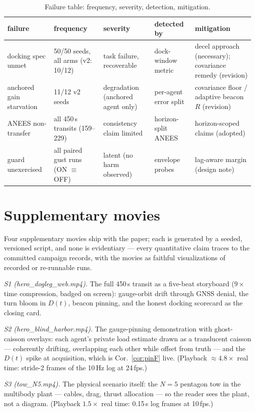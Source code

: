 \documentclass[letterpaper, 10pt, journal]{IEEEtran}
\begin{document}
\begin{table}[t]
\centering
\caption{Failure table: frequency, severity, detection, mitigation.}
\label{tab:failure}
\begin{tabular}{p{1.7cm}p{1.15cm}p{1.05cm}p{1.35cm}p{1.55cm}}
\toprule
failure & frequency & severity & detected by & mitigation \\
\midrule
docking spec unmet & 50/50 seeds, all arms (v2: 10/12) & task failure,
recoverable & dock-window metric & decel approach (necessary); covariance
remedy (revision) \\
anchored gain starvation & 11/12 v2 seeds & degradation (anchored agent
only) & per-agent error split & covariance floor / adaptive beacon $R$
(revision) \\
ANEES non-transfer & all 450\,s transits (159--229) & consistency claim
limited & horizon-split ANEES & horizon-scoped claims (adopted) \\
guard unexercised & all paired gust runs (ON $\equiv$ OFF) & latent (no
harm observed) & envelope probes & lag-aware margin (design note) \\
\bottomrule
\end{tabular}
\end{table}

\section{Supplementary movies}
Four supplementary movies ship with the paper; each is generated by a seeded,
versioned script, and none is evidentiary --- every quantitative claim traces
to the committed campaign records, with the movies as faithful visualizations
of recorded or re-runnable runs.

\emph{S1 (hero\_dogleg\_web.mp4).} The full 450\,s transit as a five-beat
storyboard ($9\times$ time compression, badged on screen): gauge-orbit drift
through GNSS denial, the turn bloom in $D(t)$, beacon pinning, and the honest
docking scorecard as the closing card.

\emph{S2 (hero\_blind\_harbor.mp4).} The gauge-pinning demonstration with
ghost-caisson overlays: each agent's private load estimate drawn as a
translucent caisson --- coherently drifting, overlapping each other while
offset from truth --- and the $D(t)$ spike at acquisition, which is
Cor.~\ref{cor:pinF} live. (Playback $\approx 4.8\times$ real time: stride-2 frames of
the 10\,Hz log at 24\,fps.)

\emph{S3 (tow\_N5.mp4).} The physical scenario itself: the $N{=}5$ pentagon
tow in the multibody plant --- cables, drag, thrust allocation --- so the
reader sees the plant, not a diagram. (Playback $1.5\times$ real time:
0.15\,s log frames at 10\,fps.)
\end{document}
